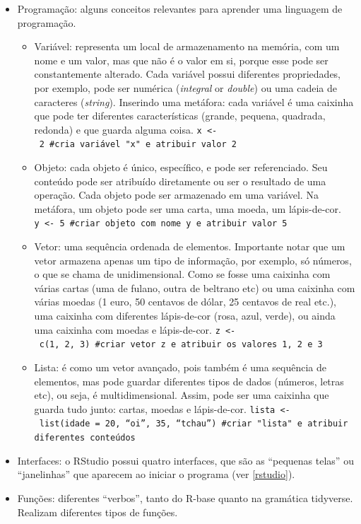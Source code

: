 \documentclass[
  10pt,
  brazil,
  a4paper,
  twoside, notitlepage, openright]{book}
\providecommand{\tightlist}{%
  \setlength{\itemsep}{0pt}\setlength{\parskip}{0pt}}
\begin{document}
\begin{itemize}
\item
  Programação: alguns conceitos relevantes para aprender uma linguagem de programação.

  \begin{itemize}
  \tightlist
  \item
    Variável: representa um local de armazenamento na memória, com um nome e um valor, mas que não é o valor em si, porque esse pode ser constantemente alterado. Cada variável possui diferentes propriedades, por exemplo, pode ser numérica (\emph{integral} or \emph{double}) ou uma cadeia de caracteres (\emph{string}). Inserindo uma metáfora: cada variável é uma caixinha que pode ter diferentes características (grande, pequena, quadrada, redonda) e que guarda alguma coisa. \texttt{x\ \textless{}-\ 2\ \#cria\ variável\ "x"\ e\ atribuir\ valor\ 2}
  \item
    Objeto: cada objeto é único, específico, e pode ser referenciado. Seu conteúdo pode ser atribuído diretamente ou ser o resultado de uma operação. Cada objeto pode ser armazenado em uma variável. Na metáfora, um objeto pode ser uma carta, uma moeda, um lápis-de-cor. \texttt{y\ \textless{}-\ 5\ \#criar\ objeto\ com\ nome\ y\ e\ atribuir\ valor\ 5}
  \item
    Vetor: uma sequência ordenada de elementos. Importante notar que um vetor armazena apenas um tipo de informação, por exemplo, só números, o que se chama de unidimensional. Como se fosse uma caixinha com várias cartas (uma de fulano, outra de beltrano etc) ou uma caixinha com várias moedas (1 euro, 50 centavos de dólar, 25 centavos de real etc.), uma caixinha com diferentes lápis-de-cor (rosa, azul, verde), ou ainda uma caixinha com moedas e lápis-de-cor. \texttt{z\ \textless{}-\ c(1,\ 2,\ 3)\ \#criar\ vetor\ z\ e\ atribuir\ os\ valores\ 1,\ 2\ e\ 3}
  \item
    Lista: é como um vetor avançado, pois também é uma sequência de elementos, mas pode guardar diferentes tipos de dados (números, letras etc), ou seja, é multidimensional. Assim, pode ser uma caixinha que guarda tudo junto: cartas, moedas e lápis-de-cor. \texttt{lista\ \textless{}-\ list(idade\ =\ 20,\ “oi”,\ 35,\ “tchau”)\ \#criar\ "lista"\ e\ atribuir\ diferentes\ conteúdos}
  \end{itemize}
\item
  Interfaces: o RStudio possui quatro interfaces, que são as ``pequenas telas'' ou ``janelinhas'' que aparecem ao iniciar o programa (ver \ref{rstudio}).
\item
  Funções: diferentes ``verbos'', tanto do R-base quanto na gramática tidyverse. Realizam diferentes tipos de funções.


\end{itemize}
\end{document}
